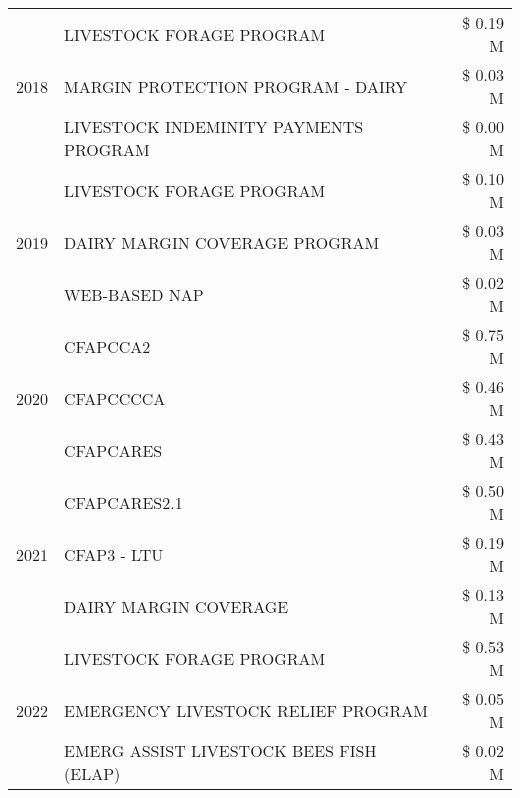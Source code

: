 \begin{tabular}{llr}
\cline{1-3}
\multirow[t]{3}{*}{2018} & LIVESTOCK FORAGE PROGRAM & \$ 0.19 M \\
 & MARGIN PROTECTION PROGRAM - DAIRY & \$ 0.03 M \\
 & LIVESTOCK INDEMINITY PAYMENTS PROGRAM & \$ 0.00 M \\
\cline{1-3}
\multirow[t]{3}{*}{2019} & LIVESTOCK FORAGE PROGRAM & \$ 0.10 M \\
 & DAIRY MARGIN COVERAGE PROGRAM & \$ 0.03 M \\
 & WEB-BASED NAP & \$ 0.02 M \\
\cline{1-3}
\multirow[t]{3}{*}{2020} & CFAPCCA2 & \$ 0.75 M \\
 & CFAPCCCCA & \$ 0.46 M \\
 & CFAPCARES & \$ 0.43 M \\
\cline{1-3}
\multirow[t]{3}{*}{2021} & CFAPCARES2.1 & \$ 0.50 M \\
 & CFAP3 - LTU & \$ 0.19 M \\
 & DAIRY MARGIN COVERAGE & \$ 0.13 M \\
\cline{1-3}
\multirow[t]{3}{*}{2022} & LIVESTOCK FORAGE PROGRAM & \$ 0.53 M \\
 & EMERGENCY LIVESTOCK RELIEF PROGRAM & \$ 0.05 M \\
 & EMERG ASSIST LIVESTOCK BEES FISH (ELAP) & \$ 0.02 M \\
\cline{1-3}
\bottomrule
\end{tabular}
